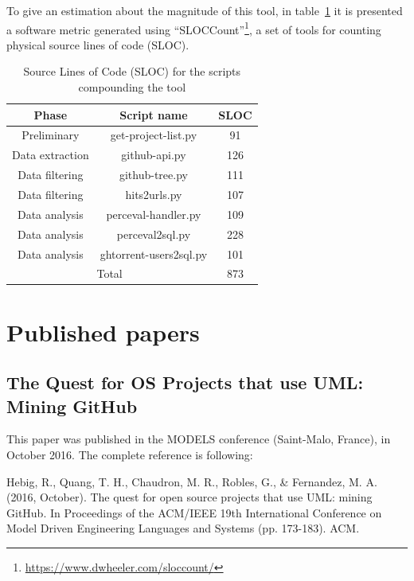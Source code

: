 \documentclass[a4paper, 12pt]{book}
\begin{document}
To give an estimation about the magnitude of this tool, in table~\ref{table:sloc} it is presented a software metric generated
using ``SLOCCount''\footnote{\url{https://www.dwheeler.com/sloccount/}}, a set of tools for counting physical source lines of code (SLOC).
\begin{table}[!htbp]
\centering
\caption{Source Lines of Code (SLOC) for the scripts compounding the tool}
\label{table:sloc}
\begin{tabular}{|c|c|c|}
\hline
\textbf{Phase}  & \textbf{Script name}   & \textbf{SLOC} \\ \hline
Preliminary     & get-project-list.py    & 91            \\
Data extraction & github-api.py          & 126           \\
Data filtering  & github-tree.py         & 111           \\
Data filtering  & hits2urls.py           & 107           \\
Data analysis   & perceval-handler.py    & 109           \\
Data analysis   & perceval2sql.py        & 228           \\
Data analysis   & ghtorrent-users2sql.py & 101           \\ \hline
\multicolumn{2}{|c|}{Total}              & 873           \\ \hline
\end{tabular}
\end{table}
\chapter{Published papers}
\label{app:papers}
\section{The Quest for OS Projects that use UML: Mining GitHub}
\label{sec:paper-models}
This paper was published in the MODELS conference (Saint-Malo, France), in October 2016.  The complete reference is following:

Hebig, R., Quang, T. H., Chaudron, M. R., Robles, G., \& Fernandez, M. A. (2016, October). The quest for open source projects that use UML: mining GitHub. In Proceedings of the ACM/IEEE 19th International Conference on Model Driven Engineering Languages and Systems (pp. 173-183). ACM.
\end{document}
